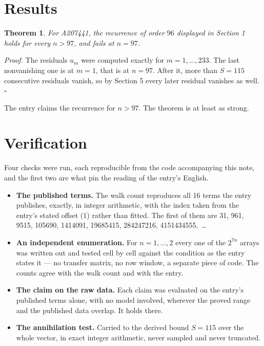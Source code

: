 \documentclass[11pt]{article}
\newtheorem{theorem}{Theorem}
\theoremstyle{definition}
\begin{document}
\section{Results}

\begin{theorem} For A207441, the recurrence of order $96$ displayed in Section 1 holds for every $n > 97$, and fails at $n = 97$.\end{theorem}

{\itshape Proof.} The residuals $u_m$ were computed exactly for $m = 1,\dots,233$. The last nonvanishing one is at $m = 1$, that is at $n = 97$. After it, more than $S = 115$ consecutive residuals vanish, so by Section 5 every later residual vanishes as well. $\square$

The entry claims the recurrence for $n > 97$. The theorem is at least as strong.

\section{Verification}

Four checks were run, each reproducible from the code accompanying this note, and the first two are what pin the reading of the entry's English.

\begin{itemize}

\item {\bfseries The published terms.} The walk count reproduces all 16 terms the entry publishes, exactly, in integer arithmetic, with the index taken from the entry's stated offset (1) rather than fitted. The first of them are 31, 961, 9515, 105690, 1414091, 19685415, 284247216, 4151434555,~\dots

\item {\bfseries An independent enumeration.} For $n = 1,\dots,2$ every one of the $2^{7n}$ arrays was written out and tested cell by cell against the condition as the entry states it --- no transfer matrix, no row window, a separate piece of code. The counts agree with the walk count and with the entry.

\item {\bfseries The claim on the raw data.} Each claim was evaluated on the entry's published terms alone, with no model involved, wherever the proved range and the published data overlap. It holds there.

\item {\bfseries The annihilation test.} Carried to the derived bound $S = 115$ over the whole vector, in exact integer arithmetic, never sampled and never truncated.

\end{itemize}
\end{document}
